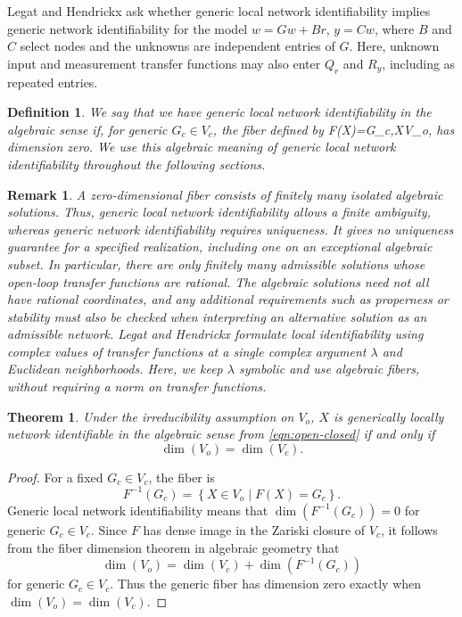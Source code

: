 \documentclass[journal,twoside,web]{ieeecolor}
\newtheorem{theorem}{Theorem}
\newtheorem{remark}{Remark}
\newtheorem{definition}{Definition}
\begin{document}
Legat and Hendrickx \cite{9303890} ask whether generic local network
identifiability implies generic network identifiability for the model
$w=Gw+Br$, $y=Cw$, where $B$ and $C$ select nodes and the unknowns are
independent entries of $G$. Here, unknown input and measurement transfer functions
may also enter $Q_r$ and $R_y$, including as repeated entries.
%
\begin{definition}
%
We say that we have generic local network identifiability in the algebraic
sense if, for generic $G_c\in V_c$, the fiber defined by
%
\BEQ\label{eqn:open-closed}
F(X)=G_c,\qquad X\in V_o,
\EEQ
%
has dimension zero. We use this algebraic meaning of generic local network
identifiability throughout the following sections.

\end{definition}
%
\begin{remark}
%
A zero-dimensional fiber consists of finitely many isolated algebraic
solutions. Thus, generic local network identifiability allows a finite
ambiguity, whereas generic network identifiability requires uniqueness.
It gives no uniqueness guarantee for a specified realization, including one
on an exceptional algebraic subset.
In particular, there are only finitely many admissible solutions whose open-loop
transfer functions are rational. The algebraic solutions need not all have
rational coordinates, and any additional requirements such as properness or
stability must also be checked when interpreting an alternative solution as an
admissible network. Legat and Hendrickx \cite{9303890} formulate local
identifiability using complex values of transfer functions at a single complex
argument $\lambda$ and Euclidean neighborhoods. Here, we keep $\lambda$ symbolic and use
algebraic fibers, without requiring a norm on transfer functions.

%
\end{remark}
%
\begin{theorem}
Under the irreducibility assumption on $V_o$, $X$ is generically
locally network identifiable in the algebraic sense from
\eqref{eqn:open-closed} if and only if 
%
$$\dim(V_o)=\dim(V_c).$$
%    
\end{theorem}
%
\begin{proof}
%
For a fixed $G_c\in V_c$, the fiber is
%
$$F^{-1}( G_c)=\left\{X\in V_o
\mid F( X) =G_c\right\}.$$
%
Generic local network identifiability means that
$\dim\left(F^{-1}( G_c)\right)=0$ for generic $G_c\in V_c$.
Since $F$ has dense image in the Zariski closure of $V_c$,
it follows from the fiber dimension theorem in algebraic geometry that
%
$$\dim(V_o)=\dim(V_c)+ \dim\left(F^{-1}(G_c)\right)$$
%
for generic $G_c\in V_c$. Thus the generic fiber has dimension zero
exactly when $\dim(V_o)=\dim(V_c)$.
%
\end{proof}
\end{document}
